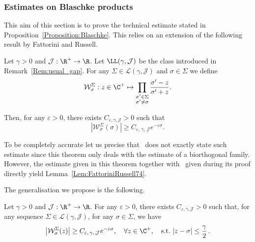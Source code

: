 \subsubsection{Estimates on Blaschke products} \label{Subsec:Blaschke}

This aim of this section is to prove the technical estimate stated in Proposition~\ref{Proposition:Blaschke}. This relies on an extension of the following result by Fattorini and Russell.
\begin{lemm} \label{Lem:FattoriniRussell74}
Let $\gamma >0$ and $\mathcal{J} : \R^+ \to \R$. Let $\LL(\gamma, \mathcal{J})$ be the class introduced in Remark~\ref{Rem:usual_gap}. For any $\Sigma \in \mathcal{L}(\gamma, \mathcal{J})$ and $\sigma \in \Sigma$ we define
\[
\mathcal{W}^\Sigma_{\sigma} : z \in \C^+ \mapsto \prod_{\substack{\sigma' \in \Sigma\\ \sigma' \neq \sigma}} \frac{\sigma'-z}{\sigma'+z}.
\]

Then, for any $\varepsilon>0$, there exists $C_{\varepsilon,\gamma, \mathcal{J}}>0$ such that
\[
\left| \mathcal{W}^{\Sigma}_{\sigma}(\sigma) \right| \geq C_{\varepsilon,\,\gamma,\, \mathcal{J}} e^{-\varepsilon \sigma}.
\]
\end{lemm}

\begin{rema}
To be completely accurate let us precise that~\cite[Theorem~1.1]{FattoriniRussell74} does not exactly state such estimate since this theorem only deals with the estimate of a biorthogonal family. However, the estimate given in this theorem together with~\cite[equality (2.1)]{FattoriniRussell74} given during its proof directly yield Lemma~\ref{Lem:FattoriniRussell74}.
\end{rema}


The generalisation we propose is the following.

\begin{lemm} \label{Lemme:ExtensionFattoriniRussell74}
Let $\gamma >0$ and $\mathcal{J} : \R^+ \to \R$. For any $\varepsilon>0$, there exists $C_{\varepsilon, \gamma, \mathcal{J}}>0$ such that, for any sequence $\Sigma \in \mathcal{L}(\gamma, \mathcal{J})$, for any $\sigma \in \Sigma$, we have
\[
\left| \mathcal{W}^{\Sigma}_{\sigma}(z) \right| \geq C_{\varepsilon,\,\gamma,\, \mathcal{J}} e^{-\varepsilon \sigma},\quad \forall z\in \C^+,\quad\text{s.t.} \ |z-\sigma| \leq \frac{\gamma}{2}\,.
\]
\end{lemm}

